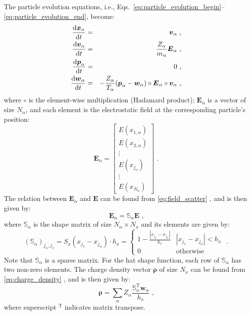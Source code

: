 \documentclass[12pt]{article}
\let\orgautoref\autoref
\renewcommand{\autoref}[1]
{%
    \def\equationautorefname{Eq.}%
    \def\figureautorefname{Fig.}%
    \def\subfigureautorefname{Fig.}%
    \def\sectionautorefname{Sec.}%
    \def\subsubsectionautorefname{Sec.}%
    \orgautoref{#1}%
}
\begin{document}
The particle evolution equations, i.e., Eqs.~\ref{eq:particle_evolution_begin}--\ref{eq:particle_evolution_end}, become:
\begin{eqnarray}
	\frac{\mathrm{d} \boldsymbol{x}_\alpha}{\mathrm{d} t} & = & \boldsymbol{v}_\alpha \textrm{ ,} \\
	\frac{\mathrm{d} \boldsymbol{v}_\alpha}{\mathrm{d} t} & = & \frac{Z_\alpha}{m_\alpha} \boldsymbol{E}_\alpha \textrm{ ,} \\
	\frac{\mathrm{d} \boldsymbol{p}_\alpha}{\mathrm{d} t} & = & 0 \textrm{ ,} \\
	\frac{\mathrm{d} \boldsymbol{w}_\alpha}{\mathrm{d} t} & = & - \frac{Z_\alpha}{T_\alpha} (\boldsymbol{p}_\alpha - \boldsymbol{w}_\alpha) \circ \boldsymbol{E}_\alpha \circ \boldsymbol{v}_\alpha \textrm{ ,}
\end{eqnarray}
where $\circ$ is the element-wise multiplication (Hadamard product);
$\boldsymbol{E}_\alpha$ is a vector of size $N_\alpha$, and each element is the electrostatic field at the corresponding particle's position:
\begin{equation}
	\boldsymbol{E}_\alpha = \left[ \begin{array}{c}
		E(x_{1,\alpha}) \\
		E(x_{2,\alpha}) \\
		\vdots \\
		E(x_{j_\alpha}) \\
		\vdots \\
		E(x_{N_\alpha})
	\end{array} \right] \textrm{ .}
\end{equation}
The relation between $\boldsymbol{E}_\alpha$ and $\boldsymbol{E}$ can be found from \autoref{eq:field_scatter}, and is then given by:
\begin{equation}
	\boldsymbol{E}_\alpha = \mathbb{S}_\alpha \boldsymbol{E} \textrm{ ,}
\end{equation}
where $\mathbb{S}_\alpha$ is the shape matrix of size $N_\alpha \times N_x$ and its elements are given by:
\begin{equation}
	(\mathbb{S}_\alpha)_{j_\alpha, j_x} = S_x(x_{j_x} - x_{j_\alpha}) \cdot h_x = \left\{ \begin{array}{ll}
		1 - \frac{|x_{j_x} - x_{j_\alpha}|}{h_x} & |x_{j_x} - x_{j_\alpha}| < h_x \\
		0 & \textrm{otherwise}
	\end{array} \right. \textrm{ .}
\end{equation}
Note that $\mathbb{S}_\alpha$ is a sparse matrix.
For the hat shape function, each row of $\mathbb{S}_\alpha$ has two non-zero elements.
The charge density vector $\boldsymbol{\rho}$ of size $N_x$ can be found from \autoref{eq:charge_density}, and is then given by:
\begin{equation}
	\boldsymbol{\rho} = \sum_\alpha Z_\alpha \frac{\mathbb{S}_\alpha^{\mathrm{T}} \boldsymbol{w}_\alpha}{h_x} \textrm{ ,}
\end{equation}
where superscript $^\mathrm{T}$ indicates matrix transpose.
\end{document}
